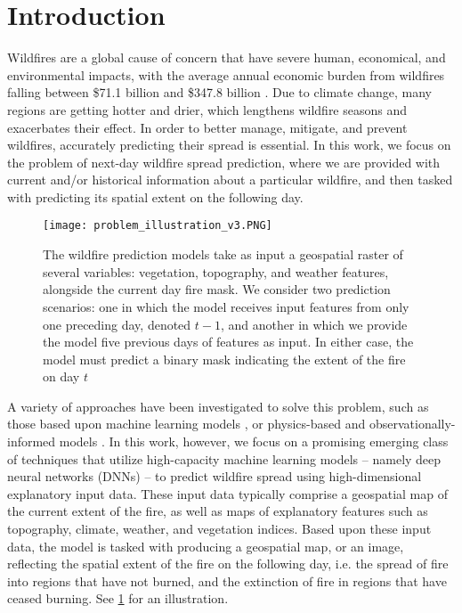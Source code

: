 
\section{Introduction}
Wildfires are a global cause of concern that have severe human, economical, and environmental impacts, with the average annual economic burden from wildfires falling between \$71.1 billion and \$347.8 billion \cite{thomas2017costs}. Due to climate change, many regions are getting hotter and drier, which lengthens wildfire seasons and exacerbates their effect.  In order to better manage, mitigate, and prevent wildfires, accurately predicting their spread is essential. In this work, we focus on the problem of next-day wildfire spread prediction, where we are provided with current and/or historical information about a particular wildfire, and then tasked with predicting its spatial extent on the following day.  

\begin{figure}
    \centering
    \texttt{[image: problem\_illustration\_v3.PNG]}
    \caption{The wildfire prediction models take as input a geospatial raster of several variables: vegetation, topography, and weather features, alongside the current day fire mask. We consider two prediction scenarios: one in which the model receives input features from only one preceding day, denoted $t-1$, and another in which we provide the model five previous days of features as input. In either case, the model must predict a binary mask indicating the extent of the fire on day $t$}
    \label{fig:problem_setting}
\end{figure}

A variety of approaches have been investigated to solve this problem, such as those based upon machine learning models \cite{khanmohammadi2022prediction, bot2022systematic, chetehouna2015predicting}, or physics-based and observationally-informed models \cite{Finney_1998, alexander2006evaluating, finney2006overview}.  In this work, however, we focus on a promising emerging class of techniques that utilize high-capacity machine learning models -- namely deep neural networks (DNNs) -- to predict wildfire spread using high-dimensional explanatory input data.  These input data typically comprise a geospatial map of the current extent of the fire, as well as maps of explanatory features such as topography, climate, weather, and vegetation indices. Based upon these input data, the model is tasked with producing a geospatial map, or an image, reflecting the spatial extent of the fire on the following day, i.e. the spread of fire into regions that have not burned, and the extinction of fire in regions that have ceased burning. See \cref{fig:problem_setting} for an illustration.  

